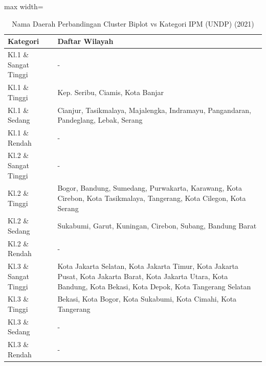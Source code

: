 \begin{table}[H]
\centering
\caption{Nama Daerah Perbandingan Cluster Biplot vs Kategori IPM (UNDP) (2021)} \label{tab:crossname2021}
\begin{adjustbox}{max width=\textwidth}
\begin{tabular}{|p{4cm}|p{10cm}|}
\hline
\textbf{Kategori} & \textbf{Daftar Wilayah} \\
\hline
Kl.1 \& Sangat Tinggi & - \\
\hline
Kl.1 \& Tinggi & Kep. Seribu, Ciamis, Kota Banjar \\
\hline
Kl.1 \& Sedang & Cianjur, Tasikmalaya, Majalengka, Indramayu, Pangandaran, Pandeglang, Lebak, Serang \\
\hline
Kl.1 \& Rendah & - \\
\hline
Kl.2 \& Sangat Tinggi & - \\
\hline
Kl.2 \& Tinggi & Bogor, Bandung, Sumedang, Purwakarta, Karawang, Kota Cirebon, Kota Tasikmalaya, Tangerang, Kota Cilegon, Kota Serang \\
\hline
Kl.2 \& Sedang & Sukabumi, Garut, Kuningan, Cirebon, Subang, Bandung Barat \\
\hline
Kl.2 \& Rendah & - \\
\hline
Kl.3 \& Sangat Tinggi & Kota Jakarta Selatan, Kota Jakarta Timur, Kota Jakarta Pusat, Kota Jakarta Barat, Kota Jakarta Utara, Kota Bandung, Kota Bekasi, Kota Depok, Kota Tangerang Selatan \\
\hline
Kl.3 \& Tinggi & Bekasi, Kota Bogor, Kota Sukabumi, Kota Cimahi, Kota Tangerang \\
\hline
Kl.3 \& Sedang & - \\
\hline
Kl.3 \& Rendah & - \\
\hline
\end{tabular}
\end{adjustbox}
\end{table}